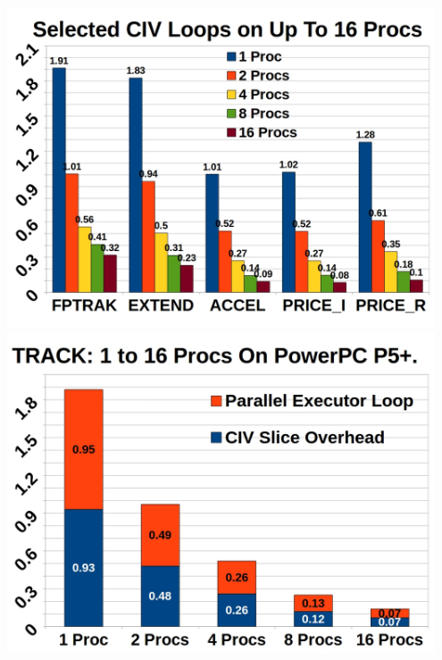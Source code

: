 \documentclass{beamer}
\begin{document}
\begin{frame}[fragile,t]
\begin{columns} 
    \includegraphics[width=0.95\textwidth]{Figures/EmpRes/LoopScalRes.jpg}
    \includegraphics[width=0.95\textwidth]{Figures/EmpRes/TrackScal.jpg}
\end{columns}

\end{frame}




\end{document}

